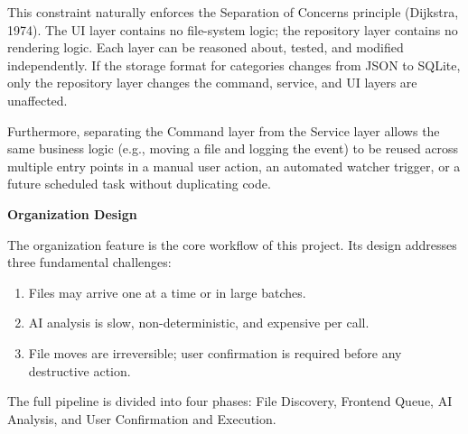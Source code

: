 \documentclass[12pt,oneside,openright,a4paper]{cpe-english-project}
\begin{document}
This constraint naturally enforces the Separation of Concerns principle (Dijkstra, 1974). The UI layer contains no file-system logic; the repository layer contains no rendering logic. Each layer can be reasoned about, tested, and modified independently. If the storage format for categories changes from JSON to SQLite, only the repository layer changes the command, service, and UI layers are unaffected.

Furthermore, separating the Command layer from the Service layer allows the same business logic (e.g., moving a file and logging the event) to be reused across multiple entry points in a manual user action, an automated watcher trigger, or a future scheduled task without duplicating code.
\vspace{0.2em}

\textbf{Organization Design}

The organization feature is the core workflow of this project. Its design addresses three fundamental challenges:
\begin{enumerate}[label=\arabic*.,leftmargin=0.6in]
\item Files may arrive one at a time or in large batches.
\item AI analysis is slow, non-deterministic, and expensive per call.
\item File moves are irreversible; user confirmation is required before any destructive action.
\end{enumerate}

The full pipeline is divided into four phases: File Discovery, Frontend Queue, AI Analysis, and User Confirmation and Execution.
\vspace{0.2em}
\end{document}
